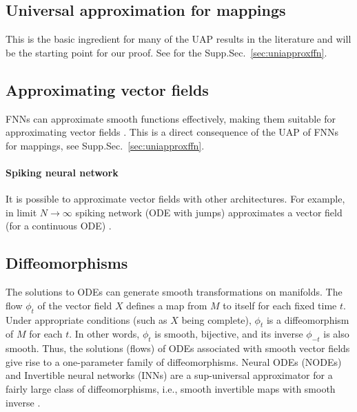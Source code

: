 \documentclass{article}
\theoremstyle{definition}
\theoremstyle{remark}
\newcounter{ct}
\begin{document}

\subsection{Universal approximation for mappings}\label{sec:uapmappings}
This is the basic ingredient for many of the UAP results in the literature and will be the starting point for our proof.
See for the  Supp.Sec.~\ref{sec:uniapproxffn}.


\subsection{Approximating vector fields}\label{sec:uapvfs}
 FNNs can approximate smooth functions effectively, making them suitable for approximating vector fields \citep{doya1993universality}.
This is a direct consequence of the UAP of FNNs for mappings, see Supp.Sec.~\ref{sec:uniapproxffn}.



\paragraph{Spiking neural network}
It is possible to approximate vector fields with other architectures.
For example, in limit $N\rightarrow\infty$ spiking network (ODE with jumps) approximates a vector field (for a continuous ODE) \citep{podlaski2024approximating}. 


\subsection{Diffeomorphisms}%
The solutions to ODEs can generate smooth transformations on manifolds.
The flow \( \phi_t \) of the vector field \( X \) defines a map from \( M \) to itself for each fixed time \( t \). Under appropriate conditions (such as \( X \) being complete), \( \phi_t \) is a diffeomorphism of \( M \) for each \( t \). In other words, \( \phi_t \) is smooth, bijective, and its inverse \( \phi_{-t} \) is also smooth.
Thus, the solutions (flows) of ODEs associated with smooth vector fields give rise to a one-parameter family of diffeomorphisms.
%
Neural ODEs (NODEs) and Invertible neural networks (INNs) are a sup-universal approximator for a fairly large class of diffeomorphisms, i.e., smooth invertible maps with smooth inverse \citep{huang2018neural, jaini2019sum, teshima2020uap, teshima2020coupling, ishikawa2023universal}.
\end{document}
